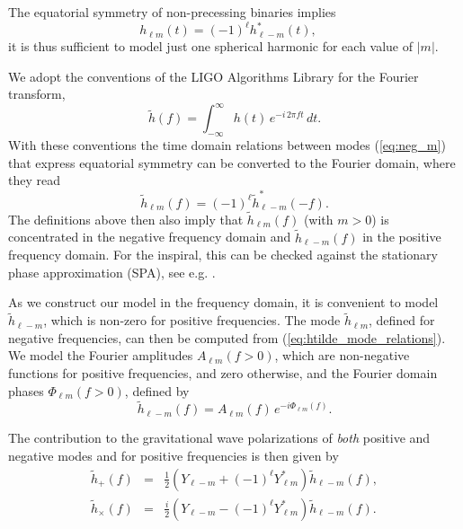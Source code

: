 \documentclass[twocolumn,prd,aps,superscriptaddress,preprintnumbers,tightenlines,showpacs,nofootinbib,eqsecnum,amsfonts,amsmath]{revtex4}
\begin{document}
The equatorial symmetry of non-precessing binaries implies
\begin{equation}\label{eq:neg_m}
    h_{\ell m}(t) = (-1)^\ell h^{*}_{\ell -m}(t), \quad 
\end{equation}
it is thus sufficient to model just one spherical harmonic for each value of $\vert m \vert$.

We adopt the conventions of the LIGO Algorithms Library \cite{lalsuite} for the Fourier transform,
\begin{equation}\label{eq:defFT}
\tilde h(f)=\int_{-\infty}^{\infty} h(t) \, e^{-i \, 2 \pi f t}\, dt .
\end{equation}
%
With these conventions the time domain relations between modes (\ref{eq:neg_m}) that express equatorial symmetry can be converted to the Fourier domain, where they read   
\begin{equation}\label{eq:htilde_mode_relations}
   \tilde h_{\ell m}(f) =  (-1)^\ell \tilde h^{*}_{\ell -m}(-f).
\end{equation}
The definitions above then also imply that $\tilde h_{\ell m}(f)$ (with $m>0$) is concentrated
in the negative frequency domain and $\tilde h_{\ell -m}(f)$ 
in the positive frequency domain. For the inspiral, this can be checked against the stationary phase approximation (SPA), see e.g. \cite{Damour:2000gg}.

As we construct our model in the frequency domain, it is convenient to model $\tilde h_{\ell -m}$, which is non-zero for positive frequencies. The mode $\tilde h_{\ell m}$, defined for negative frequencies, can then be computed from (\ref{eq:htilde_mode_relations}).
%
We model the Fourier amplitudes $A_{\ell m}(f > 0)$, which are non-negative functions for positive frequencies, and zero otherwise, and the Fourier domain phases $\Phi_{\ell m} (f > 0)$, defined by 
\begin{equation}
\label{eq:amp_and_phase}
\tilde{h}_{\ell -m} (f) = A_{\ell m} (f) \, e^{-i \Phi_{\ell m} (f)}. 
\end{equation}

The contribution to the gravitational wave polarizations of {\em both} positive and negative modes and for positive frequencies is then given by
\begin{eqnarray}\label{def:polarizations_FD}
    \tilde h_{+}(f)         &=& \frac{1}{2} \left( Y_{\ell-m} + (-1)^\ell Y_{\ell m}^*  \right) \tilde{h}_{\ell-m}(f), \\ 
    \tilde h_{\times}(f) &=& \frac{i}{2} \left( Y_{\ell-m} - (-1)^\ell Y_{\ell m}^*  \right) \tilde{h}_{\ell-m}(f).
\end{eqnarray}
\end{document}
